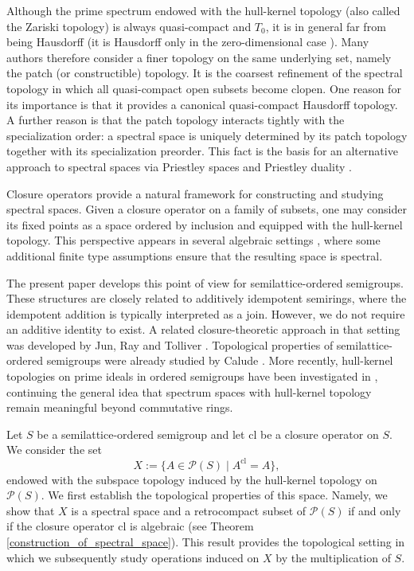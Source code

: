 \documentclass[10pt, reqno]{amsart}
\theoremstyle{plain}
\theoremstyle{definition}
\begin{document}
Although the prime spectrum endowed with the hull-kernel topology (also called the Zariski topology) is always quasi-compact and $T_0$, it is in general far from being Hausdorff (it is Hausdorff only in the zero-dimensional case \cite[Theorem 1.3]{Maroscia}). Many authors therefore consider a finer topology on the same underlying set, namely the patch (or constructible) topology. It is the coarsest refinement of the spectral topology in which all quasi-compact open subsets become clopen. One reason for its importance is that it provides a canonical quasi-compact Hausdorff topology. A further reason is that the patch topology interacts tightly with the specialization order: a spectral space is uniquely determined by its patch topology together with its specialization preorder. This fact is the basis for an alternative approach to spectral spaces via Priestley spaces and Priestley duality \cite{Dickmann_Schwartz_Tressl_2019, Priestley, Craig, JungRivieccio}. 

Closure operators provide a natural framework for constructing and studying spectral spaces. Given a closure operator on a family of subsets, one may consider its fixed points as a space ordered by inclusion and equipped with the hull-kernel topology. This perspective appears in several algebraic settings \cite{JunRayTolliver, FinocchiaroFontanaSpiritoNullstellensatz, FinocchiaroFontanaSpirito, Banerjee}, where some additional finite type assumptions ensure that the resulting space is spectral.

The present paper develops this point of view for semilattice-ordered semigroups. These structures are closely related to additively idempotent semirings, where the idempotent addition is typically interpreted as a join. However, we do not require an additive identity to exist. A related closure-theoretic approach in that setting was developed by Jun, Ray and Tolliver \cite{JunRayTolliver}. Topological properties of semilattice-ordered semigroups were already studied by Calude \cite{calude1976_1}. More recently, hull-kernel topologies on prime ideals in ordered semigroups have been investigated in \cite{huanrong, luangchaisri_changphas}, continuing the general idea that spectrum spaces with hull-kernel topology remain meaningful beyond commutative rings. 

Let $S$ be a semilattice-ordered semigroup and let $\mathrm{cl}$ be a closure operator on $S$. We consider the set $$X := \{A \in \mathcal{P}(S) \mid A^\mathrm{cl} = A\},$$ endowed with the subspace topology induced by the hull-kernel topology on $\mathcal{P}(S)$. We first establish the topological properties of this space. Namely, we show that $X$ is a spectral space and a retrocompact subset of $\mathcal{P}(S)$ if and only if the closure operator $\mathrm{cl}$ is algebraic (see Theorem \ref{construction_of_spectral_space}). This result provides the topological setting in which we subsequently study operations induced on $X$ by the multiplication of $S$.
\end{document}
